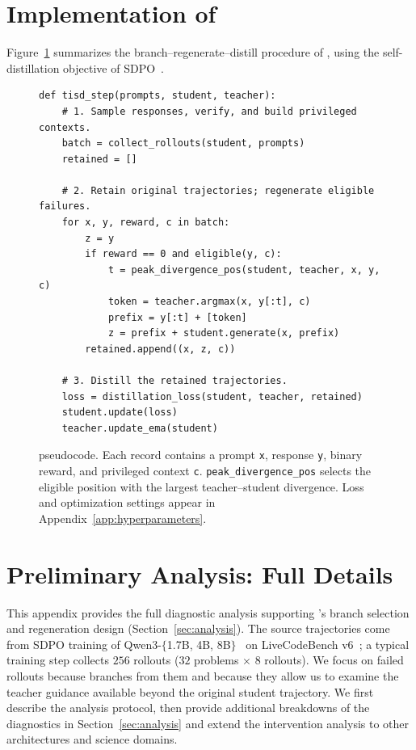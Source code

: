 \section{Implementation of \method{}}
\label{app:implementation}

Figure~\ref{fig:tisd-pseudocode} summarizes the branch--regenerate--distill procedure of \method{}, using the self-distillation objective of SDPO~\citep{hubotter2026sdpo}.

\begin{figure}[ht]
  \centering
  \begin{tcolorbox}[colback=CodeBackground,boxrule=0pt,arc=2mm,left=22pt,right=8pt,top=7pt,bottom=7pt]
\begin{lstlisting}[style=tisd-pseudocode]
def tisd_step(prompts, student, teacher):
    # 1. Sample responses, verify, and build privileged contexts.
    batch = collect_rollouts(student, prompts)
    retained = []

    # 2. Retain original trajectories; regenerate eligible failures.
    for x, y, reward, c in batch:
        z = y
        if reward == 0 and eligible(y, c):
            t = peak_divergence_pos(student, teacher, x, y, c)
            token = teacher.argmax(x, y[:t], c)
            prefix = y[:t] + [token]
            z = prefix + student.generate(x, prefix)
        retained.append((x, z, c))

    # 3. Distill the retained trajectories.
    loss = distillation_loss(student, teacher, retained)
    student.update(loss)
    teacher.update_ema(student)
\end{lstlisting}
  \end{tcolorbox}
  \caption{\method{} pseudocode. Each record contains a prompt \texttt{x}, response \texttt{y}, binary reward, and privileged context \texttt{c}. \texttt{peak\_divergence\_pos} selects the eligible position with the largest teacher--student divergence. Loss and optimization settings appear in Appendix~\ref{app:hyperparameters}.}
  \label{fig:tisd-pseudocode}
\end{figure}

\section{Preliminary Analysis: Full Details}
\label{app:analysis}

This appendix provides the full diagnostic analysis supporting \method{}'s branch selection and regeneration design (Section~\ref{sec:analysis}). The source trajectories come from SDPO training of Qwen3-$\{$1.7B, 4B, 8B$\}$~\citep{yang2025qwen3} on LiveCodeBench v6~\citep{jain2024livecodebench}; a typical training step collects $256$ rollouts ($32$ problems $\times$ $8$ rollouts). We focus on failed rollouts because \method{} branches from them and because they allow us to examine the teacher guidance available beyond the original student trajectory. We first describe the analysis protocol, then provide additional breakdowns of the diagnostics in Section~\ref{sec:analysis} and extend the intervention analysis to other architectures and science domains.

